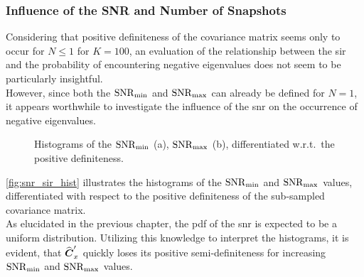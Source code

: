 \subsubsection{Influence of the SNR and Number of Snapshots}

Considering that positive definiteness of the covariance matrix seems only to occur for \( N \leq 1 \) for \( K = 100 \),
an evaluation of the relationship between the \gls{sir} and the probability of encountering negative eigenvalues
does not seem to be particularly insightful.\\
However, since both the \( \mathrm{SNR}_{\min} \) and \( \mathrm{SNR}_{\max} \) can already be defined for \( N = 1 \), it appears worthwhile to
investigate the influence of the \gls{snr} on the occurrence of negative eigenvalues.

\begin{figure}[H]
    \centering
    \caption{Histograms of the \( \mathrm{SNR}_{\min} \) (a), \( \mathrm{SNR}_{\max} \) (b), differentiated w.r.t.\ the positive definiteness.}
    \label{fig:snr_sir_hist}
\end{figure}

\autoref{fig:snr_sir_hist} illustrates the histograms of the \( \mathrm{SNR}_{\min} \) and \( \mathrm{SNR}_{\max} \) values, differentiated with
respect to the positive definiteness of the sub-sampled covariance matrix. \\
As elucidated in the previous chapter, the \gls{pdf} of the \gls{snr} is expected to be a uniform distribution. Utilizing
this knowledge to interpret the histograms, it is evident, that \( \widehat{\boldsymbol{C}}'_x \) quickly loses its positive semi-definiteness
for increasing \( \mathrm{SNR}_{\min} \) and \( \mathrm{SNR}_{\max} \) values.\\


